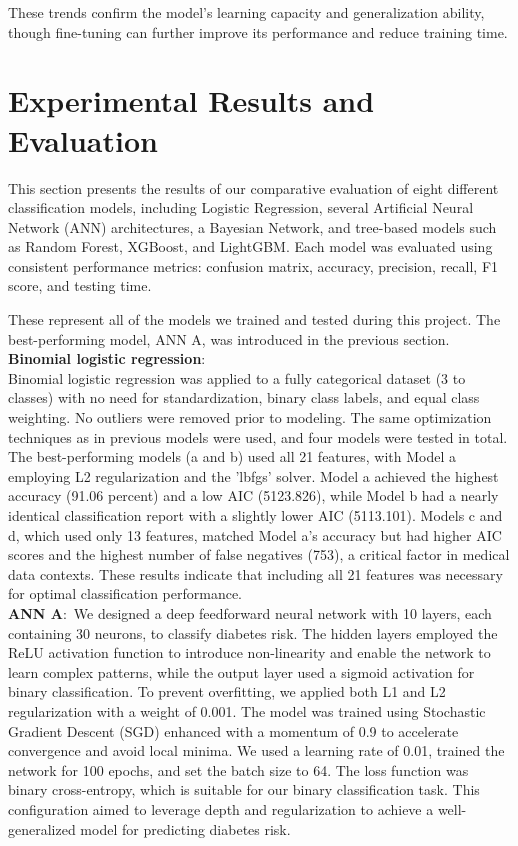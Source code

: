 \documentclass[conference]{IEEEtran}
\begin{document}
These trends confirm the model’s learning capacity and generalization ability, though fine-tuning can further improve its performance and reduce training time.\\

\section{Experimental Results and Evaluation}
This section presents the results of our comparative evaluation of eight different classification models, including Logistic Regression, several Artificial Neural Network (ANN) architectures, a Bayesian Network, and tree-based models such as Random Forest, XGBoost, and LightGBM. Each model was evaluated using consistent performance metrics: confusion matrix, accuracy, precision, recall, F1 score, and testing time.

These represent all of the models we trained and tested during this project. The best-performing model, ANN A, was introduced in the previous section.\\

\noindent
\textbf{Binomial logistic regression}:\\
Binomial logistic regression was applied to a fully categorical dataset (3 to classes) with no need for standardization, binary class labels, and equal class weighting. No outliers were removed prior to modeling. The same optimization techniques as in previous models were used, and four models were tested in total. The best-performing models (a and b) used all 21 features, with Model a employing L2 regularization and the 'lbfgs' solver. Model a achieved the highest accuracy (91.06 percent) and a low AIC (5123.826), while Model b had a nearly identical classification report with a slightly lower AIC (5113.101). Models c and d, which used only 13 features, matched Model a’s accuracy but had higher AIC scores and the highest number of false negatives (753), a critical factor in medical data contexts. These results indicate that including all 21 features was necessary for optimal classification performance.\\

\noindent
\textbf{ANN A}:\
We designed a deep feedforward neural network with 10 layers, each containing 30 neurons, to classify diabetes risk. The hidden layers employed the ReLU activation function to introduce non-linearity and enable the network to learn complex patterns, while the output layer used a sigmoid activation for binary classification. To prevent overfitting, we applied both L1 and L2 regularization with a weight of 0.001. The model was trained using Stochastic Gradient Descent (SGD) enhanced with a momentum of 0.9 to accelerate convergence and avoid local minima. We used a learning rate of 0.01, trained the network for 100 epochs, and set the batch size to 64. The loss function was binary cross-entropy, which is suitable for our binary classification task. This configuration aimed to leverage depth and regularization to achieve a well-generalized model for predicting diabetes risk.
\end{document}
